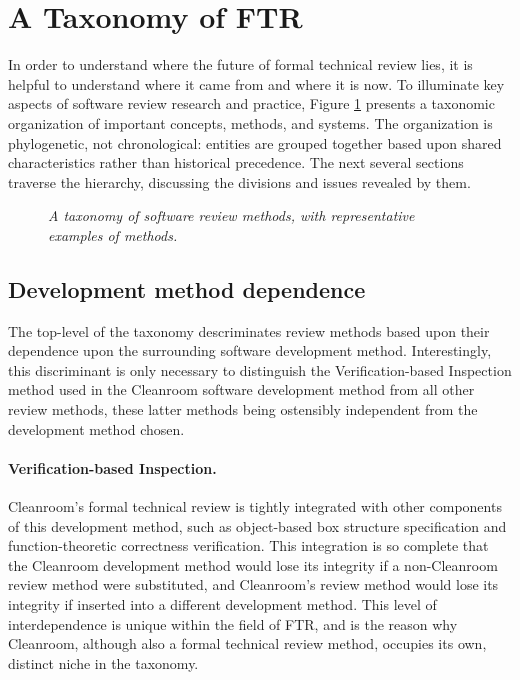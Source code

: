 \section*{A Taxonomy of FTR}

In order to understand where the future of formal technical review lies, it
is helpful to understand where it came from and where it is now.  To
illuminate key aspects of software review research and practice, Figure
\ref{fig:taxonomy} presents a taxonomic organization of important concepts,
methods, and systems.  The organization is phylogenetic, not chronological:
entities are grouped together based upon shared characteristics rather than
historical precedence.  The next several sections traverse the hierarchy,
discussing the divisions and issues revealed by them.


\begin{figure}[htpb]
\centerline{}
\caption{{\em A taxonomy of software review methods,
with representative examples of methods.}}
\label{fig:taxonomy}
\nocite{Yourdon89,McConnell93,Johnson94,Gintell93,Mashayekhi94,Brothers90,Knight93,Parnas85,Fagan76,Fagan86,Martin90,Gilb93,Humphrey90,Dyer92}
\end{figure}


\subsection*{Development method dependence}

The top-level of the taxonomy descriminates review methods based upon 
their dependence upon the surrounding software development method.
Interestingly, this discriminant is only necessary to distinguish
the Verification-based Inspection method \cite{Dyer92} used in the
Cleanroom software development method from all other review methods, these
latter methods being ostensibly independent from the development method chosen.  

\paragraph{Verification-based Inspection.}
Cleanroom's formal technical review is tightly integrated with other
components of this development method, such as object-based box structure
specification and function-theoretic correctness verification.  This
integration is so complete that the Cleanroom development method would lose
its integrity if a non-Cleanroom review method were substituted, and 
Cleanroom's review method would lose its integrity if inserted into a
different development method. This level of interdependence is unique
within the field of FTR, and is the reason why Cleanroom, although also a
formal technical review method, occupies its own, distinct niche in the
taxonomy.

